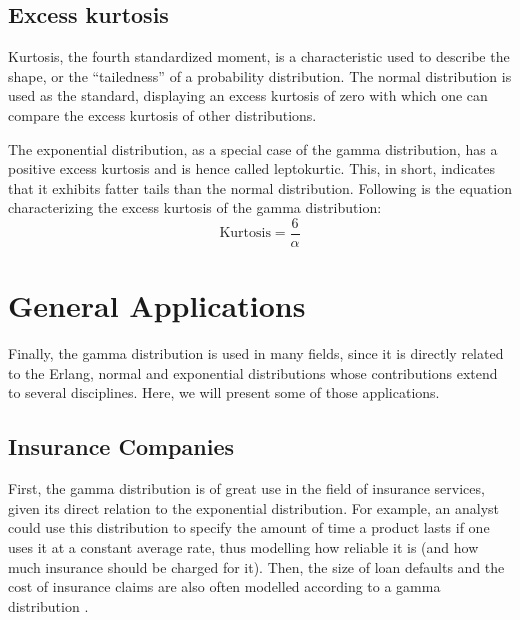 \documentclass[12pt]{article}
\begin{document}
\subsection{Excess kurtosis}
Kurtosis, the fourth standardized moment, is a characteristic used to describe the shape, or the “tailedness” of a
probability distribution. The normal distribution is used as the standard, displaying an excess kurtosis of zero with
which one can compare the excess kurtosis of other distributions\cite{wikipediaKurtosis2022}.

The exponential distribution, as a special case of the gamma distribution, has a positive excess kurtosis and is hence
called leptokurtic. This, in short, indicates that it exhibits fatter tails than the normal distribution. Following is
the equation characterizing the excess kurtosis of the gamma distribution\cite{wikipediaKurtosis2022}:
\begin{equation}
	\text{Kurtosis} = \frac{6}{\alpha}
\end{equation}


\pagebreak
\section{General Applications}\label{sec:generalApplications}
Finally, the gamma distribution is used in many fields, since it is directly related to the Erlang, normal and
exponential distributions whose contributions extend to several disciplines. Here, we will present some of those
applications.

\subsection{Insurance Companies}
First, the gamma distribution is of great use in the field of insurance services, given its direct relation to the
exponential distribution. For example, an analyst could use this distribution to specify the amount of time a product
lasts if one uses it at a constant average rate, thus modelling how reliable it is (and how much insurance should be
charged for it). Then, the size of loan defaults and the cost of insurance claims are also often modelled according to a
gamma distribution \cite{tiwariModelingInsuranceClaim2020}.
\end{document}
